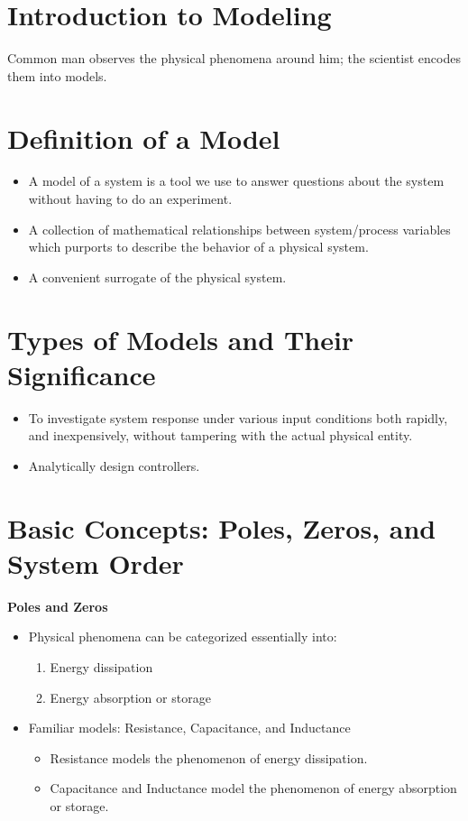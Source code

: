 \documentclass[../notes-main.tex]{subfiles}
\begin{document}
\section{Introduction to Modeling}
Common man observes the physical phenomena around him; the scientist encodes them into models.

\section{Definition of a Model}
\begin{itemize}
    \item A model of a system is a tool we use to answer questions about the system without having to do an experiment.
    \item A collection of mathematical relationships between system/process variables which purports to describe the behavior of a physical system.
    \item A convenient surrogate of the physical system.
\end{itemize}

\section{Types of Models and Their Significance}
\begin{itemize}
    \item To investigate system response under various input conditions both rapidly, and inexpensively, without tampering with the actual physical entity.
    \item Analytically design controllers.
\end{itemize}

\section{Basic Concepts: Poles, Zeros, and System Order}
\textbf{Poles and Zeros}
\begin{itemize}
    \item Physical phenomena can be categorized essentially into:
    \begin{enumerate}
        \item Energy dissipation
        \item Energy absorption or storage
    \end{enumerate}
    \item Familiar models: Resistance, Capacitance, and Inductance
    \begin{itemize}
        \item Resistance models the phenomenon of energy dissipation.
        \item Capacitance and Inductance model the phenomenon of energy absorption or storage.
    \end{itemize}
\end{itemize}
\end{document}
